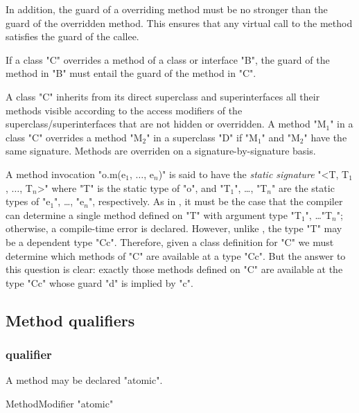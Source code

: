 In addition, the guard of a overriding method must be 
no stronger than the guard of the overridden method.   This
ensures that any virtual call to the method
satisfies the guard of the callee.

\begin{staticrule*}
  If a class \xcd"C" overrides a method of a class or interface
  \xcd"B", the guard of the method in \xcd"B" must entail
  the guard of the method in \xcd"C".
\end{staticrule*}

A class \xcd"C" inherits from its direct superclass and superinterfaces all
their methods visible according to the access modifiers
of the superclass/superinterfaces that are not hidden or overridden. A method \xcdmath"M$_1$" in a class
\xcd"C" overrides
a method \xcdmath"M$_2$" in a superclass \xcd"D" if
\xcdmath"M$_1$" and \xcdmath"M$_2$" have the same signature.
Methods are overriden on a signature-by-signature basis.

A method invocation \xcdmath"o.m(e$_1$, $\dots$, e$_n$)"
is said to have the {\em static signature}
\xcdmath"<T, T$_1$, $\dots$, T$_n$>" where \xcd"T" is the static type of
\xcd"o", and
\xcdmath"T$_1$",
\dots,
\xcdmath"T$_n$"
are the static types of \xcdmath"e$_1$", \dots, \xcdmath"e$_n$",
respectively.  As in
\Java, it must be the case that the compiler can determine a single
method defined on \xcd"T" with argument type
\xcdmath"T$_1$", \dots \xcdmath"T$_n$"; otherwise, a
compile-time error is declared. However, unlike \Java, the \Xten{} type \xcd"T"
may be a dependent type \xcd"C{c}". Therefore, given a class definition for
\xcd"C" we must determine which methods of \xcd"C" are available at a type
\xcd"C{c}". But the answer to this question is clear: exactly those methods
defined on \xcd"C" are available at the type \xcd"C{c}"
whose guard \xcd"d" is implied by \xcd"c".

\subsection{Method qualifiers}
\label{MethodQualifier}

\subsubsection{ qualifier}
\label{AtomicAnnotation}

A method may be declared \xcd"atomic".

\begin{grammar}
  MethodModifier \: \xcd"atomic"  
\end{grammar}


